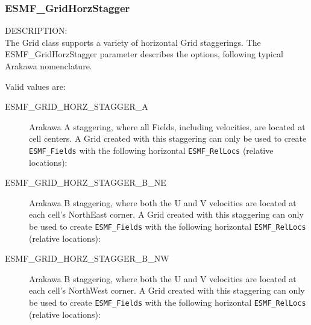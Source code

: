  \subsubsection{ESMF\_GridHorzStagger}
 \label{sec:GridHorzStagger}

 {\sf DESCRIPTION:\\}
 The Grid class supports a variety of horizontal Grid staggerings.  The
 {ESMF\_GridHorzStagger} parameter describes the options, following typical
 Arakawa nomenclature.

 Valid values are:
 \begin{description}
    \item [ESMF\_GRID\_HORZ\_STAGGER\_A]
          Arakawa A staggering, where all Fields, including velocities, are
          located at cell centers.  A Grid created with this staggering can
          only be used to create {\tt ESMF\_Fields} with the following
          horizontal {\tt ESMF\_RelLocs} (relative locations):

    \item [ESMF\_GRID\_HORZ\_STAGGER\_B\_NE]
          Arakawa B staggering, where both the U and V velocities are located at
          each cell's NorthEast corner.  A Grid created with this staggering can
          only be used to create {\tt ESMF\_Fields} with the following
          horizontal {\tt ESMF\_RelLocs} (relative locations):

    \item [ESMF\_GRID\_HORZ\_STAGGER\_B\_NW]
          Arakawa B staggering, where both the U and V velocities are located at
          each cell's NorthWest corner.  A Grid created with this staggering can
          only be used to create {\tt ESMF\_Fields} with the following
          horizontal {\tt ESMF\_RelLocs} (relative locations):
 

\end{description}
